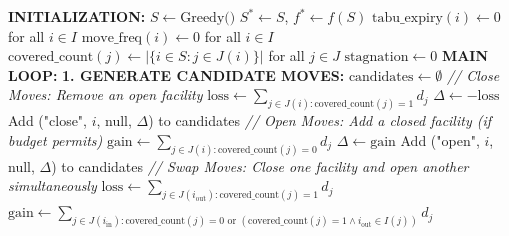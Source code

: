 \documentclass[11pt,a4paper]{article}
\begin{document}
\begin{algorithm}[H]
\caption{Tabu Search for MCLP (Detailed)}
\begin{algorithmic}[1]
\State \textbf{INITIALIZATION:}
\State $S \leftarrow \text{Greedy()}$ 
\State $S^* \leftarrow S$, $f^* \leftarrow f(S)$ 
\State $\text{tabu\_expiry}(i) \leftarrow 0$ for all $i \in I$ 
\State $\text{move\_freq}(i) \leftarrow 0$ for all $i \in I$ 
\State $\text{covered\_count}(j) \leftarrow |\{i \in S : j \in J(i)\}|$ for all $j \in J$ 
\State $\text{stagnation} \leftarrow 0$ 
\State
\State \textbf{MAIN LOOP:}
    \State
    \State \textbf{1. GENERATE CANDIDATE MOVES:}
    \State $\text{candidates} \leftarrow \emptyset$ 
    \State
    \State \textit{// Close Moves: Remove an open facility}
        \State $\text{loss} \leftarrow \sum_{j \in J(i) : \text{covered\_count}(j) = 1} d_j$ 
        \State $\Delta \leftarrow -\text{loss}$ 
        \State Add ("close", $i$, null, $\Delta$) to candidates
    \EndFor
    \State
    \State \textit{// Open Moves: Add a closed facility (if budget permits)}
        \State $\text{gain} \leftarrow \sum_{j \in J(i) : \text{covered\_count}(j) = 0} d_j$ 
        \State $\Delta \leftarrow \text{gain}$ 
        \State Add ("open", $i$, null, $\Delta$) to candidates
    \EndFor
    \State
    \State \textit{// Swap Moves: Close one facility and open another simultaneously}
            \State $\text{loss} \leftarrow \sum_{j \in J(i_{\text{out}}) : \text{covered\_count}(j) = 1} d_j$ 
            \State $\text{gain} \leftarrow \sum_{j \in J(i_{\text{in}}) : \text{covered\_count}(j) = 0 \text{ or } (\text{covered\_count}(j) = 1 \land i_{\text{out}} \in I(j))} d_j$

\end{algorithmic}
\end{algorithm}
\end{document}
